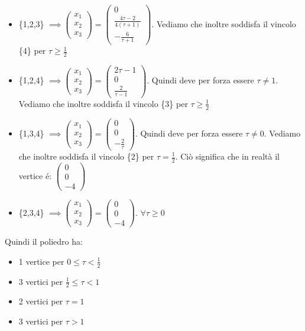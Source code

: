 \begin{itemize}
    \item \{1,2,3\} $\implies \begin{pmatrix}
        x_1\\
        x_2\\
        x_3
    \end{pmatrix} = \begin{pmatrix}
        0\\
        \frac{4\tau - 2}{4(\tau +1)}\\
        -\frac{6}{\tau + 1}
    \end{pmatrix}$. Vediamo che inoltre soddisfa il vincolo \{4\} per $\tau \geq \frac{1}{2}$
    \item \{1,2,4\} $\implies \begin{pmatrix}
        x_1\\
        x_2\\
        x_3
    \end{pmatrix} = \begin{pmatrix}
        2\tau - 1\\
        0\\
        \frac{2}{\tau - 1}
    \end{pmatrix}$. Quindi deve per forza essere $\tau \neq 1$. Vediamo che inoltre soddisfa il vincolo \{3\} per $\tau \geq \frac{1}{2}$
    \item \{1,3,4\} $\implies \begin{pmatrix}
        x_1\\
        x_2\\
        x_3
    \end{pmatrix} = \begin{pmatrix}
        0\\
        0\\
        -\frac{2}{\tau}
    \end{pmatrix}$. Quindi deve per forza essere $\tau \neq 0$. Vediamo che inoltre soddisfa il vincolo \{2\} per $\tau = \frac{1}{2}$. Ciò significa che in realtà il vertice é:
    $\begin{pmatrix}
        0\\
        0\\
        -4
    \end{pmatrix}$
    \item \{2,3,4\} $\implies \begin{pmatrix}
        x_1\\
        x_2\\
        x_3
    \end{pmatrix} = \begin{pmatrix}
        0\\
        0\\
        -4
    \end{pmatrix}$. $\forall \tau \geq 0$
\end{itemize}
Quindi il poliedro ha:
\begin{itemize}
    \item 1 vertice per $0 \leq \tau < \frac{1}{2}$
    \item 3 vertici per $\frac{1}{2} \leq \tau < 1$
    \item 2 vertici per $\tau = 1$
    \item 3 vertici per $\tau > 1$
\end{itemize}